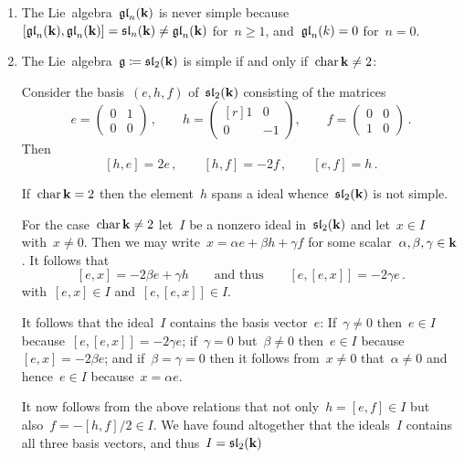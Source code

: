 \begin{examples}
  \leavevmode
  \begin{enumerate}
    \item
      The Lie~algebra~$\mathfrak{gl}_n(\mathbf{k})$ is never simple because~$[\mathfrak{gl}_n(\mathbf{k}), \mathfrak{gl}_n(\mathbf{k})] = \mathfrak{sl}_n(\mathbf{k}) \neq \mathfrak{gl}_n(\mathbf{k})$ for~$n \geq 1$, and~$\mathfrak{gl}_n(k) = 0$ for~$n = 0$.
    \item
      The Lie~algebra~$\mathfrak{g} \coloneqq \mathfrak{sl}_2(\mathbf{k})$ is simple if and only if~$\operatorname{char} \mathbf{k} \neq 2$:
      
      Consider the basis~$(e,h,f)$ of~$\mathfrak{sl}_2(\mathbf{k})$ consisting of the matrices
      \[
        e
        =
        \begin{pmatrix}
          0 & 1 \\
          0 & 0
        \end{pmatrix} \,,
        \qquad
        h
        =
        \begin{pmatrix*}[r]
          1 &  0  \\
          0 & -1
        \end{pmatrix*},
        \qquad
        f
        =
        \begin{pmatrix}
          0 & 0 \\
          1 & 0
        \end{pmatrix} \,.
      \]
      Then
      \[
        [h,e] = 2e  \,,
        \qquad
        [h,f] = -2f \,,
        \qquad
        [e,f] = h \,.
      \]
      
      If~$\operatorname{char} \mathbf{k} = 2$ then the element~$h$ spans a {\onedimensional} ideal whence~$\mathfrak{sl}_2(\mathbf{k})$ is not simple.
      
      For the case~$\operatorname{char} \mathbf{k} \neq 2$ let~$I$ be a nonzero ideal in~$\mathfrak{sl}_2(\mathbf{k})$ and let~$x \in I$ with~$x \neq 0$.
      Then we may write~$x = \alpha e + \beta h + \gamma f$ for some scalar~$\alpha, \beta, \gamma \in \mathbf{k}$.
      It follows that
      \[
        [e,x]
        =
        -2 \beta e + \gamma h
        \qquad \text{and thus}\qquad
        [e,[e,x]]
        =
        -2 \gamma e \,.
      \]
      with~$[e,x] \in I$ and~$[e,[e,x]] \in I$.
      
      It follows that the ideal~$I$ contains the basis vector~$e$:
      If~$\gamma \neq 0$ then~$e \in I$ because~$[e,[e,x]] = -2 \gamma e$;
      if~$\gamma = 0$ but~$\beta \neq 0$ then~$e \in I$ because~$[e,x] = -2 \beta e$;
      and if~$\beta = \gamma = 0$ then it follows from~$x \neq 0$ that~$\alpha \neq 0$ and hence~$e \in I$ because~$x = \alpha e$.
      
      It now follows from the above relations that not only~$h = [e,f] \in I$ but also~$f = -[h,f]/2 \in I$.
      We have found altogether that the ideals~$I$ contains all three basis vectors, and thus~$I = \mathfrak{sl}_2(\mathbf{k})$
  \end{enumerate}
\end{examples}


